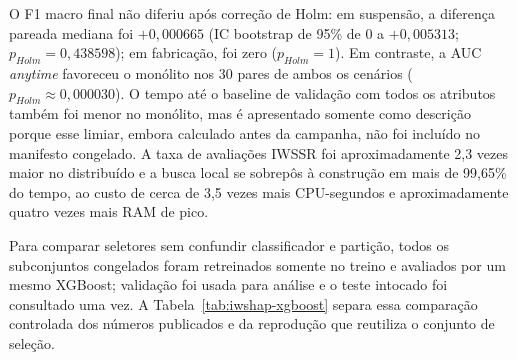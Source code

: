 \begin{landscape}
\begin{table}[p]
\centering
\scriptsize
\caption{Replicação arquitetural no X-CANIDS: medianas de 30 sementes por arquitetura e cenário.}
\label{tab:iwshap-architecture}
\end{table}
\end{landscape}

O F1 macro final não diferiu após correção de Holm: em suspensão, a diferença pareada mediana foi $+0{,}000665$ (IC bootstrap de 95\% de 0 a $+0{,}005313$; $p_{Holm}=0{,}438598$); em fabricação, foi zero ($p_{Holm}=1$). Em contraste, a AUC \textit{anytime} favoreceu o monólito nos 30 pares de ambos os cenários ($p_{Holm}\approx0{,}000030$). O tempo até o baseline de validação com todos os atributos também foi menor no monólito, mas é apresentado somente como descrição porque esse limiar, embora calculado antes da campanha, não foi incluído no manifesto congelado. A taxa de avaliações IWSSR foi aproximadamente 2,3 vezes maior no distribuído e a busca local se sobrepôs à construção em mais de 99,65\% do tempo, ao custo de cerca de 3,5 vezes mais CPU-segundos e aproximadamente quatro vezes mais RAM de pico.

Para comparar seletores sem confundir classificador e partição, todos os subconjuntos congelados foram retreinados somente no treino e avaliados por um mesmo XGBoost; validação foi usada para análise e o teste intocado foi consultado uma vez. A Tabela~\ref{tab:iwshap-xgboost} separa essa comparação controlada dos números publicados e da reprodução que reutiliza o conjunto de seleção.

